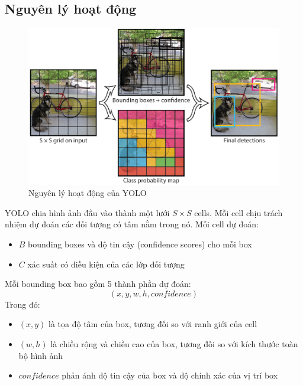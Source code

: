 \subsection{Nguyên lý hoạt động}
\begin{figure}[!htp]
    \centering
    \includegraphics[width=\textwidth]{img/yolo_1}
    \caption{Nguyên lý hoạt động của YOLO}
    \label{fig:yolo_architecture}
\end{figure}
YOLO chia hình ảnh đầu vào thành một lưới $S \times S$ cells. Mỗi cell chịu
trách nhiệm dự đoán các đối tượng có tâm nằm trong nó. Mỗi cell dự đoán:
\begin{itemize}
    \item $B$ bounding boxes và độ tin cậy (confidence scores) cho mỗi box

    \item $C$ xác suất có điều kiện của các lớp đối tượng
\end{itemize}

Mỗi bounding box bao gồm 5 thành phần dự đoán:
\begin{equation}
    (x, y, w, h, confidence)
\end{equation}
Trong đó:
\begin{itemize}
    \item $(x, y)$ là tọa độ tâm của box, tương đối so với ranh giới của cell

    \item $(w, h)$ là chiều rộng và chiều cao của box, tương đối so với kích
        thước toàn bộ hình ảnh

    \item $confidence$ phản ánh độ tin cậy của box và độ chính xác của vị trí box
\end{itemize}

